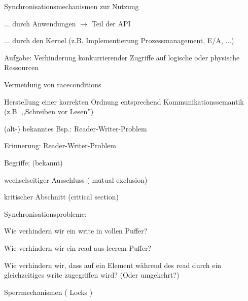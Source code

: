 \documentclass[a4paper]{article}
\begin{document}
\begin{multicols}{3}
    \begin{itemize*}
        \item
        Synchronisationsmechanismen zur Nutzung
        \begin{itemize*}
            \item ... durch Anwendungen $\rightarrow$ Teil der API
            \item ... durch den Kernel (z.B. Implementierung Prozessmanagement, E/A, ...)
        \end{itemize*}
        \item
        Aufgabe: Verhinderung konkurrierender Zugriffe auf logische oder
        physische Ressourcen
        \begin{itemize*}
            \item Vermeidung von raceconditions
            \item Herstellung einer korrekten Ordnung entsprechend Kommunikationssemantik (z.B. ,,Schreiben vor Lesen'')
        \end{itemize*}
        \item
        (alt-) bekanntes Bsp.: Reader-Writer-Problem
    \end{itemize*}

    Erinnerung: Reader-Writer-Problem

    \begin{itemize*}
        \item
        Begriffe: (bekannt)
        \begin{itemize*}
            \item wechselseitiger Ausschluss ( mutual exclusion)
            \item kritischer Abschnitt (critical section)
        \end{itemize*}
        \item
        Synchronisationsprobleme:
        \begin{itemize*}
            \item Wie verhindern wir ein write in vollen Puffer?
            \item Wie verhindern wir ein read aus leerem Puffer?
            \item Wie verhindern wir, dass auf ein Element während des read durch ein gleichzeitiges write zugegriffen wird? (Oder umgekehrt?)
        \end{itemize*}
    \end{itemize*}

    Sperrmechanismen ( Locks )


\end{multicols}
\end{document}
